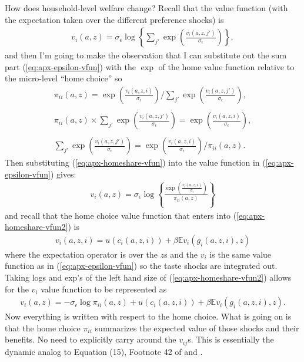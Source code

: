 \documentclass[12pt,pdftex]{article}
\begin{document}
\begin{onehalfspacing}
How does household-level welfare change? Recall that the value function (with the expectation taken over the different preference shocks) is
\begin{align}
v_i(a, z) =  \sigma_{\epsilon} \log \left\{ \sum_{j'} \exp \left( \frac{  v_{i}(a, z, j')}{\sigma_{\epsilon}} \right) \right\},
\label{eq:apx-epsilon-vfun}
\end{align}
and then I'm going to make the observation that I can substitute out the sum part (\ref{eq:apx-epsilon-vfun}) with the $\exp$ of the home value function relative to the micro-level ``home choice'' so
\begin{align}
\pi_{ii}(a, z) = \exp \left( \frac{ v_{i}(a, z, i) }{\sigma_{\epsilon}} \right) \Bigg / \sum_{j'} \exp \left( \frac{ v_{i}(a, z, j') }{\sigma_{\epsilon}} \right), \\
\nonumber \\
\pi_{ii}(a, z) \times \sum_{j'} \exp \left( \frac{ v_{i}(a, z, j') }{\sigma_{\epsilon}} \right) = \exp \left( \frac{ v_{i}(a, z, i) }{\sigma_{\epsilon}} \right), \\
\nonumber \\
\sum_{j'} \exp \left( \frac{ v_{i}(a, z, j') }{\sigma_{\epsilon}} \right) = \exp \left( \frac{ v_{i}(a, z, i) }{\sigma_{\epsilon}} \right) \Bigg / \pi_{ii}(a, z).
\label{eq:apx-homeshare-vfun}
\end{align}
Then substituting (\ref{eq:apx-homeshare-vfun}) into the value function in (\ref{eq:apx-epsilon-vfun}) gives:
\begin{align}
v_i(a, z) =  \sigma_{\epsilon} \log \left\{ \frac{ \exp \left( \frac{  v_{i}(a, z, i)}{\sigma_{\epsilon}}\right )}{\pi_{ii}(a,z)}  \right\}
\label{eq:apx-homeshare-vfun2}
\end{align}
and recall that the home choice value function that enters into (\ref{eq:apx-homeshare-vfun2}) is
\begin{align}
v_{i}(a, z, i) = u(c_{i}(a,z,i)) + \beta \mathbb{E} v_{i}(g_{i}(a,z,i),z)
\end{align}
where the expectation operator is over the $z$s and the $v_{i}$ is the same value function as in (\ref{eq:apx-epsilon-vfun}) so the taste shocks are integrated out. Taking logs and exp's of the left hand size of (\ref{eq:apx-homeshare-vfun2}) allows for the $v_i$ value function to be represented as
\begin{align}
v_i(a, z) = -\sigma_{\epsilon} \log \pi_{ii}(a,z) + u(c_{i}(a,z,i)) + \beta \mathbb{E} v_{i}(g_{i}(a,z,i),z).
\label{eq:apx-home-valuefun}
\end{align}
Now everything is written with respect to the home choice. What is going on is that the home choice $\pi_{ii}$ summarizes the expected value of those shocks and their benefits. No need to explicitly carry around the $v_{ij}$s. This is essentially the dynamic analog to Equation (15), Footnote 42 of \citet{eaton2002technology} and \citet{arkolakis2012new}.


\end{onehalfspacing}
\end{document}
